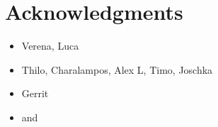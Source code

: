 



\vspace{3cm}

\begingroup
\let\clearpage\relax
\let\cleardoublepage\relax
\let\cleardoublepage\relax
\chapter*{Acknowledgments}
\begin{itemize}
    \item Verena, Luca
    \item Thilo, Charalampos, Alex L, Timo, Joschka
    \item Gerrit
    \item {} and 
\end{itemize}


\endgroup
